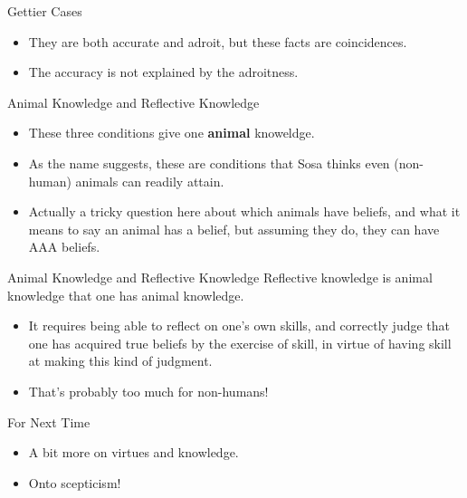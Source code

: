 \documentclass[
  17pt,
  letterpaper,
  ignorenonframetext,
  aspectratio=169,
  handout]{beamer}
\providecommand{\tightlist}{%
  \setlength{\itemsep}{0pt}\setlength{\parskip}{0pt}}\usepackage{longtable,booktabs,array}
\begin{document}
\begin{frame}{Gettier Cases}
\protect\hypertarget{gettier-cases}{}
\begin{itemize}[<+->]
\tightlist
\item
  They are both accurate and adroit, but these facts are coincidences.
\item
  The accuracy is not explained by the adroitness.
\end{itemize}
\end{frame}

\begin{frame}{Animal Knowledge and Reflective Knowledge}
\protect\hypertarget{animal-knowledge-and-reflective-knowledge}{}
\begin{itemize}[<+->]
\tightlist
\item
  These three conditions give one \textbf{animal} knoweldge.
\item
  As the name suggests, these are conditions that Sosa thinks even
  (non-human) animals can readily attain.
\item
  Actually a tricky question here about which animals have beliefs, and
  what it means to say an animal has a belief, but assuming they do,
  they can have AAA beliefs.
\end{itemize}
\end{frame}

\begin{frame}{Animal Knowledge and Reflective Knowledge}
\protect\hypertarget{animal-knowledge-and-reflective-knowledge-1}{}
Reflective knowledge is animal knowledge that one has animal knowledge.

\begin{itemize}[<+->]
\tightlist
\item
  It requires being able to reflect on one's own skills, and correctly
  judge that one has acquired true beliefs by the exercise of skill, in
  virtue of having skill at making this kind of judgment.
\item
  That's probably too much for non-humans!
\end{itemize}
\end{frame}

\begin{frame}{For Next Time}
\protect\hypertarget{for-next-time}{}
\begin{itemize}[<+->]
\tightlist
\item
  A bit more on virtues and knowledge.
\item
  Onto scepticism!
\end{itemize}
\end{frame}
\end{document}
